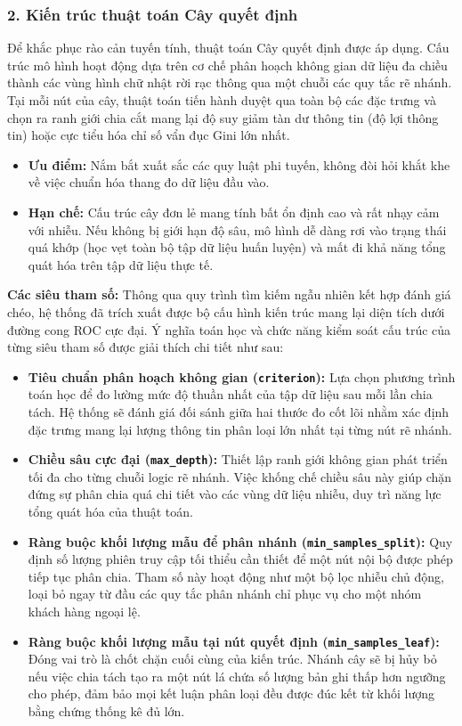 \documentclass[a4paper,11pt]{article}
\begin{document}
\subsubsection*{2. Kiến trúc thuật toán Cây quyết định}
Để khắc phục rào cản tuyến tính, thuật toán Cây quyết định được áp dụng. Cấu trúc mô hình hoạt động dựa trên cơ chế phân hoạch không gian dữ liệu đa chiều thành các vùng hình chữ nhật rời rạc thông qua một chuỗi các quy tắc rẽ nhánh. Tại mỗi nút của cây, thuật toán tiến hành duyệt qua toàn bộ các đặc trưng và chọn ra ranh giới chia cắt mang lại độ suy giảm tàn dư thông tin (độ lợi thông tin) hoặc cực tiểu hóa chỉ số vẩn đục Gini lớn nhất.
\begin{itemize}
    \item \textbf{Ưu điểm:} Nắm bắt xuất sắc các quy luật phi tuyến, không đòi hỏi khắt khe về việc chuẩn hóa thang đo dữ liệu đầu vào.
    \item \textbf{Hạn chế:} Cấu trúc cây đơn lẻ mang tính bất ổn định cao và rất nhạy cảm với nhiễu. Nếu không bị giới hạn độ sâu, mô hình dễ dàng rơi vào trạng thái quá khớp (học vẹt toàn bộ tập dữ liệu huấn luyện) và mất đi khả năng tổng quát hóa trên tập dữ liệu thực tế.
\end{itemize}
\textbf{Các siêu tham số:} 
   Thông qua quy trình tìm kiếm ngẫu nhiên kết hợp đánh giá chéo, hệ thống đã trích xuất được bộ cấu hình kiến trúc mang lại diện tích dưới đường cong ROC cực đại. Ý nghĩa toán học và chức năng kiểm soát cấu trúc của từng siêu tham số được giải thích chi tiết như sau:

\begin{itemize}[itemsep=4pt, leftmargin=*]
    \item \textbf{Tiêu chuẩn phân hoạch không gian (\texttt{criterion}):} Lựa chọn phương trình toán học để đo lường mức độ thuần nhất của tập dữ liệu sau mỗi lần chia tách. Hệ thống sẽ đánh giá đối sánh giữa hai thước đo cốt lõi nhằm xác định đặc trưng mang lại lượng thông tin phân loại lớn nhất tại từng nút rẽ nhánh.
    
    \item \textbf{Chiều sâu cực đại (\texttt{max\_depth}):} Thiết lập ranh giới không gian phát triển tối đa cho từng chuỗi logic rẽ nhánh. Việc khống chế chiều sâu này giúp chặn đứng sự phân chia quá chi tiết vào các vùng dữ liệu nhiễu, duy trì năng lực tổng quát hóa của thuật toán.
    
    \item \textbf{Ràng buộc khối lượng mẫu để phân nhánh (\texttt{min\_samples\_split}):} Quy định số lượng phiên truy cập tối thiểu cần thiết để một nút nội bộ được phép tiếp tục phân chia. Tham số này hoạt động như một bộ lọc nhiễu chủ động, loại bỏ ngay từ đầu các quy tắc phân nhánh chỉ phục vụ cho một nhóm khách hàng ngoại lệ.
    
    \item \textbf{Ràng buộc khối lượng mẫu tại nút quyết định (\texttt{min\_samples\_leaf}):} Đóng vai trò là chốt chặn cuối cùng của kiến trúc. Nhánh cây sẽ bị hủy bỏ nếu việc chia tách tạo ra một nút lá chứa số lượng bản ghi thấp hơn ngưỡng cho phép, đảm bảo mọi kết luận phân loại đều được đúc kết từ khối lượng bằng chứng thống kê đủ lớn.
\end{itemize}
\end{document}
